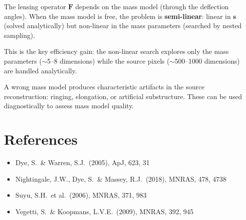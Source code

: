 \documentclass[11pt, letterpaper]{article}
\begin{document}
The lensing operator $\mathbf{F}$ depends on the mass model (through
the deflection angles). When the mass model is free, the problem is
\textbf{semi-linear}: linear in $\mathbf{s}$ (solved analytically)
but non-linear in the mass parameters (searched by nested sampling).

This is the key efficiency gain: the non-linear search explores only
the mass parameters ($\sim$5--8 dimensions) while the source pixels
($\sim$500--1000 dimensions) are handled analytically.

A wrong mass model produces characteristic artifacts in the source
reconstruction: ringing, elongation, or artificial substructure.
These can be used diagnostically to assess mass model quality.

\section*{References}

\begin{itemize}[nosep, leftmargin=*]
  \item Dye, S.\ \& Warren, S.J.\ (2005), ApJ, 623, 31
  \item Nightingale, J.W., Dye, S.\ \& Massey, R.J.\ (2018), MNRAS, 478, 4738
  \item Suyu, S.H.\ et al.\ (2006), MNRAS, 371, 983
  \item Vegetti, S.\ \& Koopmans, L.V.E.\ (2009), MNRAS, 392, 945
\end{itemize}
\end{document}
